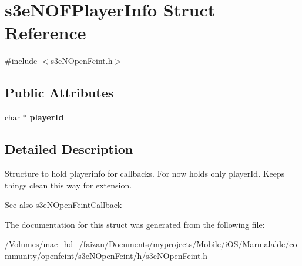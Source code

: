 \hypertarget{structs3e_n_o_f_player_info}{
\section{s3eNOFPlayerInfo Struct Reference}
\label{structs3e_n_o_f_player_info}
}


{\ttfamily \#include $<$s3eNOpenFeint.h$>$}

\subsection*{Public Attributes}
\begin{DoxyCompactItemize}
\item 
\hypertarget{structs3e_n_o_f_player_info_a30ac2a010171e6ad878cb9cdc0c906ce}{
char $\ast$ {\bfseries playerId}}
\label{structs3e_n_o_f_player_info_a30ac2a010171e6ad878cb9cdc0c906ce}

\end{DoxyCompactItemize}


\subsection{Detailed Description}
Structure to hold playerinfo for callbacks. For now holds only playerId. Keeps things clean this way for extension.

\begin{DoxySeeAlso}{See also}
s3eNOpenFeintCallback 
\end{DoxySeeAlso}


The documentation for this struct was generated from the following file:\begin{DoxyCompactItemize}
\item 
/Volumes/mac\_\-hd\_/faizan/Documents/myprojects/Mobile/iOS/Marmalalde/community/openfeint/s3eNOpenFeint/h/s3eNOpenFeint.h\end{DoxyCompactItemize}
